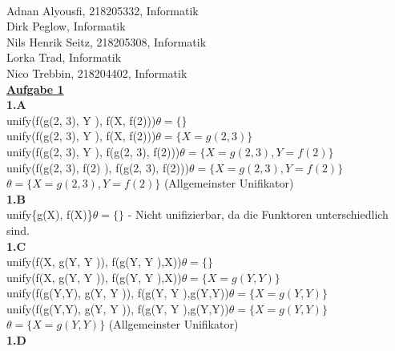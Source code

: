 \documentclass[a4paper, dvipsnames]{article}
\begin{document}
{   {\hspace{6,0cm}{Gruppe 10}}\\

Adnan Alyousfi, 218205332, Informatik\\
Dirk Peglow, Informatik\\
Nils Henrik Seitz, 218205308, Informatik\\
Lorka Trad, Informatik\\
Nico Trebbin, 218204402, Informatik\\

\uline{\bfseries{Aufgabe 1}}\\

{\bfseries 1.A}\\

unify({\color{red}f}(g(2, 3), Y ), {\color{red}f}(X, f(2)))\quad$\theta = \{\}$\\
unify(f({\color{red}g(2, 3)}, Y ), f({\color{red}X}, f(2)))\quad$\theta = \{X = g(2,3)\}$\\
unify(f(g(2, 3), {\color{red}Y} ), f(g(2, 3), {\color{red}f(2)}))\quad$\theta = \{X = g(2,3), Y = f(2)\}$\\
unify(f(g(2, 3), f(2) ), f(g(2, 3), f(2)))\quad$\theta = \{X = g(2,3), Y = f(2)\}$\\
$\theta = \{X = g(2,3), Y = f(2)\}$ (Allgemeinster Unifikator)\\

{\bfseries 1.B}\\

unify\{{\color{red}g}(X), {\color{red}f}(X)\}\quad$\theta = \{\}$ - Nicht unifizierbar, da die Funktoren unterschiedlich sind.\\

{\bfseries 1.C}\\

unify({\color{red}f}(X, g(Y, Y )), {\color{red}f}(g(Y, Y ),X))\quad$\theta = \{\}$\\
unify(f({\color{red}X}, g(Y, Y )), f({\color{red}g(Y, Y )},X))\quad$\theta = \{X = g(Y,Y)\}$\\
unify(f(g(Y,Y), \color{red}g(Y, Y )}), f(g(Y, Y ),{\color{red}g(Y,Y)})\quad$\theta = \{X = g(Y,Y)\}$\\
unify(f(g(Y,Y), g(Y, Y )), f(g(Y, Y ),g(Y,Y))\quad$\theta = \{X = g(Y,Y)\}$\\
$\theta = \{X = g(Y,Y)\}$ (Allgemeinster Unifikator)\\

{\bfseries 1.D}\\
\end{document}
